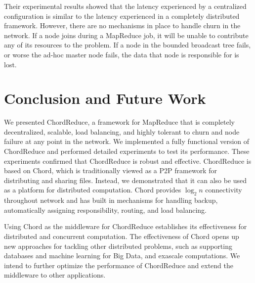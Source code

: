 \documentclass[10pt, conference, compsocconf]{IEEEtran}
\begin{document}
Their experimental results showed that the latency experienced by a centralized configuration is similar to the latency experienced in a completely distributed framework.  However, there are no mechanisms in place to handle churn in the network.  If a node joins during a MapReduce job, it will be unable to contribute any of its resources to the problem. If a node in the bounded broadcast tree fails, or worse the ad-hoc master node fails, the data that node is responsible for is lost. 

\section{Conclusion and Future Work}
We presented ChordReduce, a framework for MapReduce that is completely decentralized, scalable, load balancing, and highly tolerant to churn and node failure at any point in the network. We implemented a fully functional version of ChordReduce and performed detailed experiments to test its performance. These experiments confirmed that ChordReduce is robust and effective. ChordReduce is based on Chord, which is traditionally viewed as a P2P framework for distributing and sharing files.  Instead, we demonstrated that it can also be used as a platform for distributed computation.  Chord provides $\log_{2} n$ connectivity throughout network and has built in mechanisms for handling backup, automatically assigning responsibility, routing, and load balancing. 



Using Chord as the middleware for ChordReduce establishes its effectiveness for distributed and concurrent computation.
The effectiveness of Chord opens up new approaches for tackling other distributed problems, such as supporting databases and machine learning for Big Data, and exascale computations. We intend to further optimize the performance of ChordReduce and extend the middleware to other applications.





\end{document}
